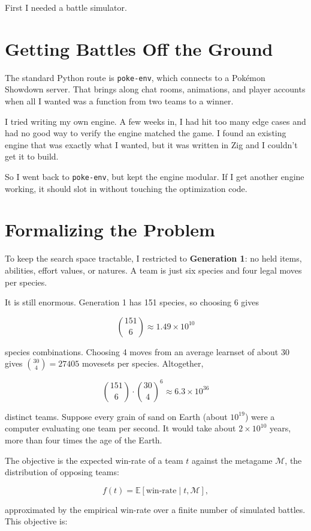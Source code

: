\documentclass{article}
\begin{document}
First I needed a battle simulator.

\section{Getting Battles Off the Ground}

The standard Python route is \texttt{poke-env}, which connects to a Pokémon Showdown server. That brings along chat rooms, animations, and player accounts when all I wanted was a function from two teams to a winner.

I tried writing my own engine. A few weeks in, I had hit too many edge cases and had no good way to verify the engine matched the game. I found an existing engine that was exactly what I wanted, but it was written in Zig and I couldn't get it to build.

So I went back to \texttt{poke-env}, but kept the engine modular. If I get another engine working, it should slot in without touching the optimization code.

\section{Formalizing the Problem}

To keep the search space tractable, I restricted to \textbf{Generation 1}: no held items, abilities, effort values, or natures. A team is just six species and four legal moves per species.

It is still enormous. Generation 1 has 151 species, so choosing 6 gives

\[\binom{151}{6} \approx 1.49 \times 10^{10}\]

species combinations. Choosing 4 moves from an average learnset of about 30 gives $\binom{30}{4} = 27405$ movesets per species. Altogether,

\[\binom{151}{6} \cdot \binom{30}{4}^6 \approx 6.3 \times 10^{36}\]

distinct teams. Suppose every grain of sand on Earth (about $10^{19}$) were a computer evaluating one team per second. It would take about $2 \times 10^{10}$ years, more than four times the age of the Earth.

The objective is the expected win-rate of a team $t$ against the metagame $\mathcal{M}$, the distribution of opposing teams:

\[f(t) = \mathbb{E}[\text{win-rate} \mid t, \mathcal{M}],\]

approximated by the empirical win-rate over a finite number of simulated battles. This objective is:
\end{document}
